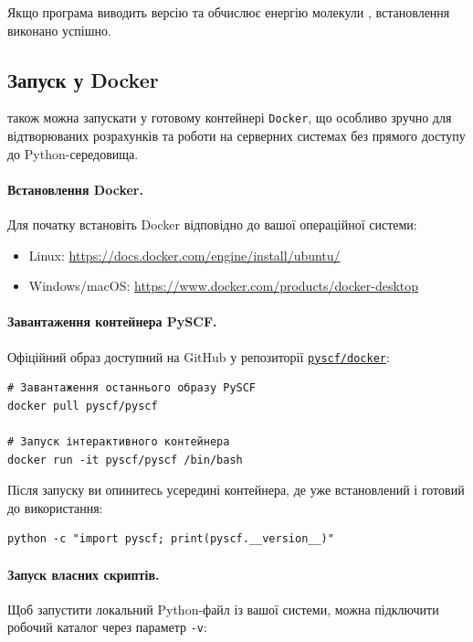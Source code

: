 Якщо програма виводить версію та обчислює енергію молекули , встановлення виконано успішно.

\subsection{Запуск \PySCF{} у Docker}

\PySCF{} також можна запускати у готовому контейнері \texttt{Docker}, що особливо зручно для відтворюваних розрахунків та роботи на серверних системах без прямого доступу до Python-середовища.

\paragraph{Встановлення Docker.}
Для початку встановіть Docker відповідно до вашої операційної системи:
\begin{itemize}
  \item Linux: \url{https://docs.docker.com/engine/install/ubuntu/}
  \item Windows/macOS: \url{https://www.docker.com/products/docker-desktop}
\end{itemize}

\paragraph{Завантаження контейнера PySCF.}
Офіційний образ доступний на GitHub у репозиторії \href{https://github.com/pyscf/pyscf/tree/master/docker}{\texttt{pyscf/docker}}:

\begin{verbatim}
# Завантаження останнього образу PySCF
docker pull pyscf/pyscf

# Запуск інтерактивного контейнера
docker run -it pyscf/pyscf /bin/bash
\end{verbatim}

Після запуску ви опинитесь усередині контейнера, де \PySCF{} уже встановлений і готовий до використання:

\begin{verbatim}
python -c "import pyscf; print(pyscf.__version__)"
\end{verbatim}

\paragraph{Запуск власних скриптів.}
Щоб запустити локальний Python-файл із вашої системи, можна підключити робочий каталог через параметр \texttt{-v}:

